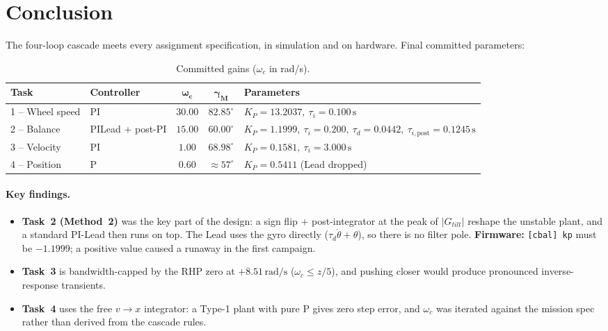 \section{Conclusion}
\label{sec:conclusion}

The four-loop cascade meets every assignment specification, in simulation and on hardware. Final committed parameters:

\begin{table}[H]
    \centering\small
    \begin{tabular}{l|l|c|c|l}
        \textbf{Task} & \textbf{Controller} & $\boldsymbol{\omega_c}$ & $\boldsymbol{\gamma_M}$ & \textbf{Parameters} \\
        \hline
        1 -- Wheel speed & PI & $30.00$ & $82.85^{\circ}$ & $K_P = 13.2037,\ \tau_i = 0.100\,\mathrm{s}$ \\
        2 -- Balance & PILead + post-PI & $15.00$ & $60.00^{\circ}$ & $K_P = 1.1999,\ \tau_i = 0.200,\ \tau_d = 0.0442,\ \tau_{i,\mathrm{post}} = 0.1245\,\mathrm{s}$ \\
        3 -- Velocity & PI & $1.00$ & $68.98^{\circ}$ & $K_P = 0.1581,\ \tau_i = 3.000\,\mathrm{s}$ \\
        4 -- Position & P & $0.60$ & $\approx 57^{\circ}$ & $K_P = 0.5411$ (Lead dropped) \\
    \end{tabular}
    \caption{Committed gains ($\omega_c$ in rad/s).}
    \label{tab:final_gains}
\end{table}

\paragraph{Key findings.}
\begin{itemize}[leftmargin=*,nosep]
    \item \textbf{Task~2 (Method~2)} was the key part of the design: a sign flip $+$ post-integrator at the peak of $|G_{tilt}|$ reshape the unstable plant, and a standard PI-Lead then runs on top. The Lead uses the gyro directly ($\tau_d \dot{\theta} + \theta$), so there is no filter pole. \textbf{Firmware:} \texttt{[cbal] kp} must be $\mathbf{-1.1999}$; a positive value caused a runaway in the first campaign.
    \item \textbf{Task~3} is bandwidth-capped by the RHP zero at $+8.51\,\mathrm{rad/s}$ ($\omega_c \leq z/5$), and pushing closer would produce pronounced inverse-response transients.
    \item \textbf{Task~4} uses the free $v\!\to\!x$ integrator: a Type-1 plant with pure P gives zero step error, and $\omega_c$ was iterated against the mission spec rather than derived from the cascade rules.
\end{itemize}
